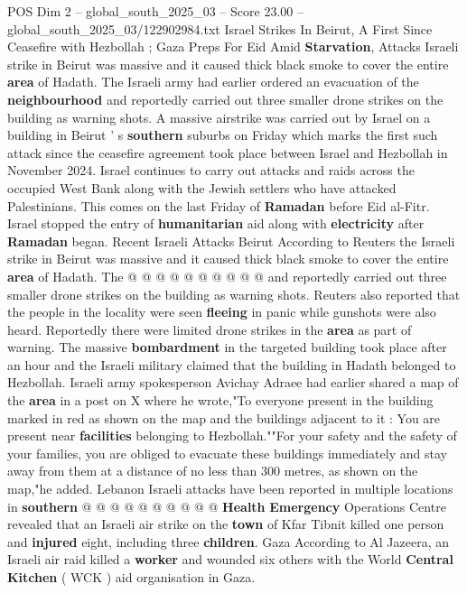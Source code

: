 \begin{textsample}{POS Dim 2 – global\_south\_2025\_03 – Score 23.00 – global\_south\_2025\_03/122902984.txt}  \label{ex:f2_pos_307}
Israel Strikes In Beirut, A First Since Ceasefire with Hezbollah ; Gaza Preps For Eid Amid \textbf{Starvation}, Attacks Israeli strike in Beirut was massive and it caused thick black smoke to cover the entire \textbf{area} of Hadath.
The Israeli army had earlier ordered an evacuation of the \textbf{neighbourhood} and reportedly carried out three smaller drone strikes on the building as warning shots.
A massive airstrike was carried out by Israel on a building in Beirut ' s \textbf{southern} suburbs on Friday which marks the first such attack since the ceasefire agreement took place between Israel and Hezbollah in November 2024.
Israel continues to carry out attacks and raids across the occupied West Bank along with the Jewish settlers who have attacked Palestinians.
This comes on the last Friday of \textbf{Ramadan} before Eid al-Fitr.
Israel stopped the entry of \textbf{humanitarian} aid along with \textbf{electricity} after \textbf{Ramadan} began.
Recent Israeli Attacks Beirut According to Reuters the Israeli strike in Beirut was massive and it caused thick black smoke to cover the entire \textbf{area} of Hadath.
The @ @ @ @ @ @ @ @ @ @ and reportedly carried out three smaller drone strikes on the building as warning shots.
Reuters also reported that the people in the locality were seen \textbf{fleeing} in panic while gunshots were also heard.
Reportedly there were limited drone strikes in the \textbf{area} as part of warning.
The massive \textbf{bombardment} in the targeted building took place after an hour and the Israeli military claimed that the building in Hadath belonged to Hezbollah.
Israeli army spokesperson Avichay Adraee had earlier shared a map of the \textbf{area} in a post on X where he wrote,"To everyone present in the building marked in red as shown on the map and the buildings adjacent to it : You are present near \textbf{facilities} belonging to Hezbollah.""For your safety and the safety of your families, you are obliged to evacuate these buildings immediately and stay away from them at a distance of no less than 300 metres, as shown on the map,"he added.
Lebanon Israeli attacks have been reported in multiple locations in \textbf{southern} @ @ @ @ @ @ @ @ @ @ \textbf{Health} \textbf{Emergency} Operations Centre revealed that an Israeli air strike on the \textbf{town} of Kfar Tibnit killed one person and \textbf{injured} eight, including three \textbf{children}.
Gaza According to Al Jazeera, an Israeli air raid killed a \textbf{worker} and wounded six others with the World \textbf{Central} \textbf{Kitchen} ( WCK ) aid organisation in Gaza.

\end{textsample}
